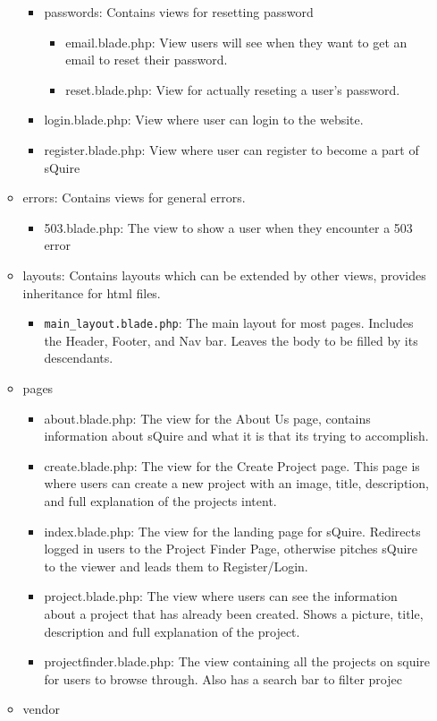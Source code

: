\documentclass[11pt]{report}
\begin{document}
\begin{itemize}
\begin{itemize}
\begin{itemize}
\begin{itemize}
            \end{itemize}
            \item passwords: Contains views for resetting password
            \begin{itemize}
                \item email.blade.php: View users will see when they want to get an email to reset their password.
                \item reset.blade.php: View for actually reseting a user's password.
            \end{itemize}
            \item login.blade.php: View where user can login to the website.
            \item register.blade.php: View where user can register to become a part of sQuire
        \end{itemize}
        \item errors: Contains views for general errors.
        \begin{itemize}
            \item 503.blade.php: The view to show a user when they encounter a 503 error
        \end{itemize}
        \item layouts: Contains layouts which can be extended by other views, provides inheritance for html files.
        \begin{itemize}
            \item \texttt{main\_layout.blade.php}: The main layout for most pages. Includes the Header, Footer, and Nav bar. Leaves the body to be filled by its descendants.
        \end{itemize}
        \item pages
        \begin{itemize}
            \item about.blade.php: The view for the About Us page, contains information about sQuire and what it is that its trying to accomplish.
            \item create.blade.php: The view for the Create Project page. This page is where users can create a new project with an image, title, description, and full explanation of the projects intent.
            \item index.blade.php: The view for the landing page for sQuire. Redirects logged in users to the Project Finder Page, otherwise pitches sQuire to the viewer and leads them to Register/Login.
            \item project.blade.php: The view where users can see the information about a project that has already been created. Shows a picture, title, description and full explanation of the project.
            \item projectfinder.blade.php: The view containing all the projects on squire for users to browse through. Also has a search bar to filter projec
        \end{itemize}
        \item vendor
    \end{itemize}
\end{itemize}
\end{document}
